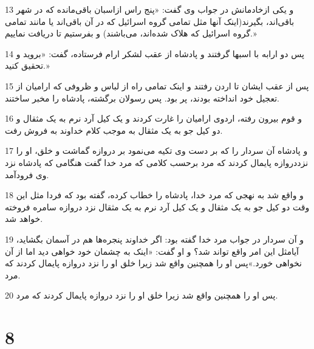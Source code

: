 \par 13 و یکی ازخادمانش در جواب وی گفت: «پنج راس ازاسبان باقی‌مانده که در شهر باقی‌اند، بگیرند(اینک آنها مثل تمامی گروه اسرائیل که در آن باقی‌اند یا مانند تمامی گروه اسرائیل که هلاک شده‌اند، می‌باشند) و بفرستیم تا دریافت نماییم.»
\par 14 پس دو ارابه با اسبها گرفتند و پادشاه از عقب لشکر ارام فرستاده، گفت: «بروید و تحقیق کنید.»
\par 15 پس از عقب ایشان تا اردن رفتند و اینک تمامی راه از لباس و ظروفی که ارامیان از تعجیل خود انداخته بودند، پر بود. پس رسولان برگشته، پادشاه را مخبر ساختند.
\par 16 و قوم بیرون رفته، اردوی ارامیان را غارت کردند و یک کیل آرد نرم به یک مثقال و دو کیل جو به یک مثقال به موجب کلام خداوند به فروش رفت.
\par 17 و پادشاه آن سردار را که بر دست وی تکیه می‌نمود بر دروازه گماشت و خلق، او را نزددروازه پایمال کردند که مرد بر‌حسب کلامی که مرد خدا گفت هنگامی که پادشاه نزد وی فرودآمد.
\par 18 و واقع شد به نهجی که مرد خدا، پادشاه را خطاب کرده، گفته بود که فردا مثل این وقت دو کیل جو به یک مثقال و یک کیل آرد نرم به یک مثقال نزد دروازه سامره فروخته خواهد شد.
\par 19 و آن سردار در جواب مرد خدا گفته بود: اگر خداوند پنجره‌ها هم در آسمان بگشاید، آیامثل این امر واقع تواند شد؟ و او گفت: «اینک به چشمان خود خواهی دید اما از آن نخواهی خورد.»پس او را همچنین واقع شد زیرا خلق او را نزد دروازه پایمال کردند که مرد.
\par 20 پس او را همچنین واقع شد زیرا خلق او را نزد دروازه پایمال کردند که مرد.
 
\chapter{8}

